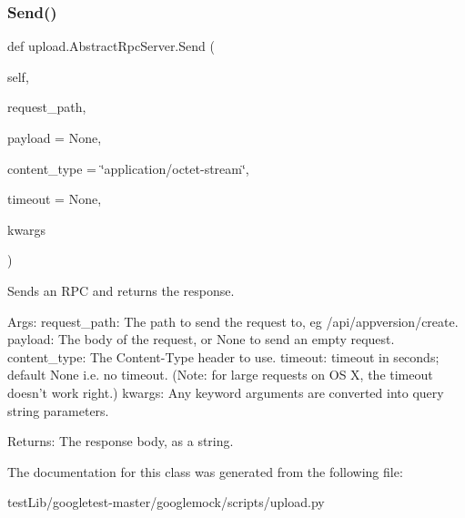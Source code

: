 \subsubsection{\texorpdfstring{Send()}{Send()}\hspace{0.1cm}{\footnotesize\ttfamily [2/2]}}
{\footnotesize\ttfamily def upload.\+Abstract\+Rpc\+Server.\+Send (\begin{DoxyParamCaption}\item[{}]{self,  }\item[{}]{request\+\_\+path,  }\item[{}]{payload = {\ttfamily None},  }\item[{}]{content\+\_\+type = {\ttfamily \char`\"{}application/octet-\/stream\char`\"{}},  }\item[{}]{timeout = {\ttfamily None},  }\item[{}]{kwargs }\end{DoxyParamCaption})}

\begin{DoxyVerb}Sends an RPC and returns the response.

Args:
  request_path: The path to send the request to, eg /api/appversion/create.
  payload: The body of the request, or None to send an empty request.
  content_type: The Content-Type header to use.
  timeout: timeout in seconds; default None i.e. no timeout.
(Note: for large requests on OS X, the timeout doesn't work right.)
  kwargs: Any keyword arguments are converted into query string parameters.

Returns:
  The response body, as a string.
\end{DoxyVerb}
 

The documentation for this class was generated from the following file\+:\begin{DoxyCompactItemize}
\item 
test\+Lib/googletest-\/master/googlemock/scripts/upload.\+py\end{DoxyCompactItemize}
